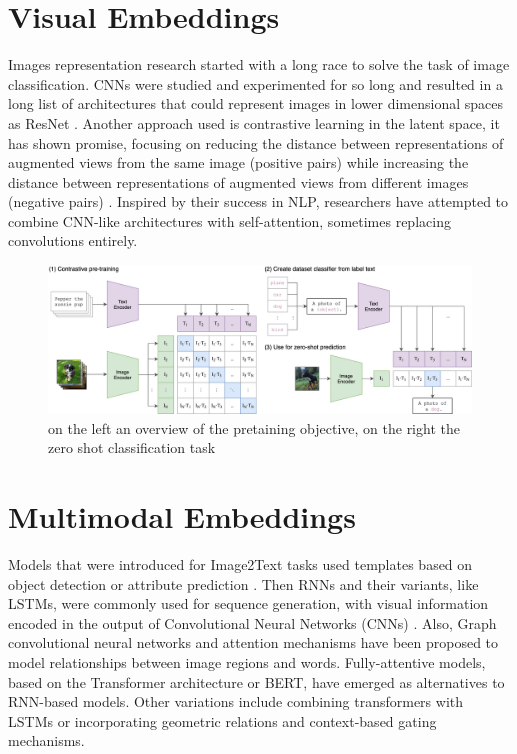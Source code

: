 \documentclass[11pt,a4paper]{article}
\begin{document}
\section{Visual Embeddings}
Images representation research started with a long race to solve the task of image classification. CNNs were studied and experimented for so long and resulted in a long list of architectures that could represent images in lower dimensional spaces as ResNet \cite{he2015deep}.
Another approach used is contrastive learning in the latent space, it has shown promise, focusing on reducing the distance between representations of augmented views from the same image (positive pairs) while increasing the distance between representations of augmented views from different images (negative pairs) \cite{oord2019representation}.
Inspired by their success in NLP, researchers have attempted to combine CNN-like architectures with self-attention, sometimes replacing convolutions entirely.

\begin{figure}[t]
  \centering
  \includegraphics[width=\textwidth]{CLIP.png}
  \caption{on the left an overview of the pretaining objective, on the right the zero shot classification task}
  \label{fig:clip}
\end{figure}

\section{Multimodal Embeddings}
Models that were introduced for Image2Text tasks used templates based on object detection or attribute prediction \cite{inproceedings}. Then RNNs and their variants, like LSTMs, were commonly used for sequence generation, with visual information encoded in the output of Convolutional Neural Networks (CNNs) \cite{yao2018exploring}. Also, Graph convolutional neural networks and attention mechanisms have been proposed to model relationships between image regions and words. Fully-attentive models, based on the Transformer architecture or BERT, have emerged as alternatives to RNN-based models. Other variations include combining transformers with LSTMs or incorporating geometric relations and context-based gating mechanisms.
\end{document}
